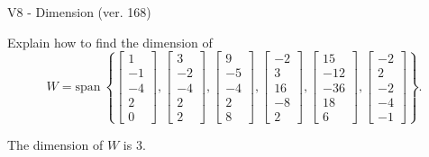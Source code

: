 \begin{exercise}
  \begin{exerciseTitle}V8 - Dimension (ver. 168)\end{exerciseTitle}
  \begin{exerciseStatement}
    Explain how to find the dimension of 
\[W=\mathrm{span}\ \left\{\left[\begin{array}{r}
1 \\
-1 \\
-4 \\
2 \\
0
\end{array}\right] , \left[\begin{array}{r}
3 \\
-2 \\
-4 \\
2 \\
2
\end{array}\right] , \left[\begin{array}{r}
9 \\
-5 \\
-4 \\
2 \\
8
\end{array}\right] , \left[\begin{array}{r}
-2 \\
3 \\
16 \\
-8 \\
2
\end{array}\right] , \left[\begin{array}{r}
15 \\
-12 \\
-36 \\
18 \\
6
\end{array}\right] , \left[\begin{array}{r}
-2 \\
2 \\
-2 \\
-4 \\
-1
\end{array}\right]\right\}.\]



  \end{exerciseStatement}
  \begin{exerciseAnswer}
   The dimension of \(W\) is  \(3\).
  


  \end{exerciseAnswer}
\end{exercise}